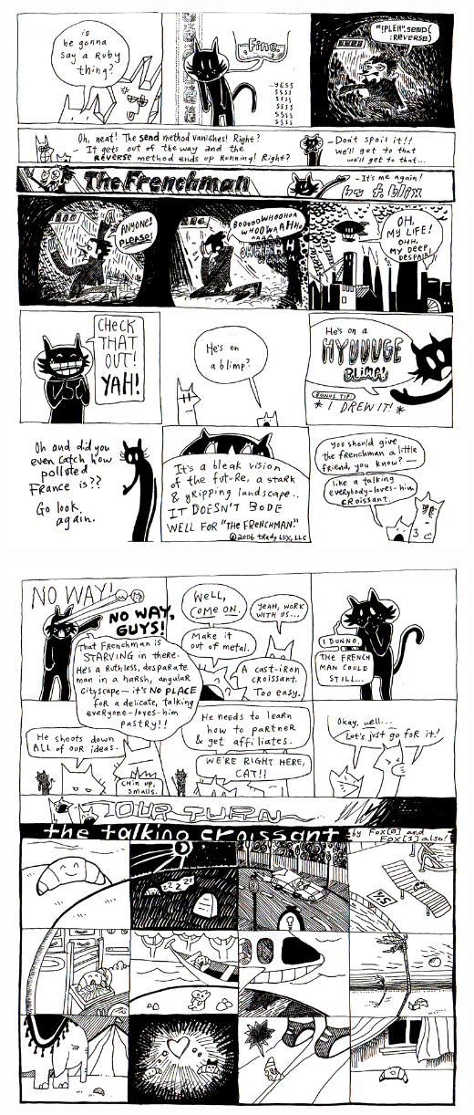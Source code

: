 \documentclass[10pt,twoside]{report}
\begin{document}
\vspace*{0.6cm} \includegraphics[width=1.0\textwidth]{cache/84.png}
\newpage

\vspace*{0.6cm} \includegraphics[width=1.0\textwidth]{cache/85.png}
\newpage
\end{document}
